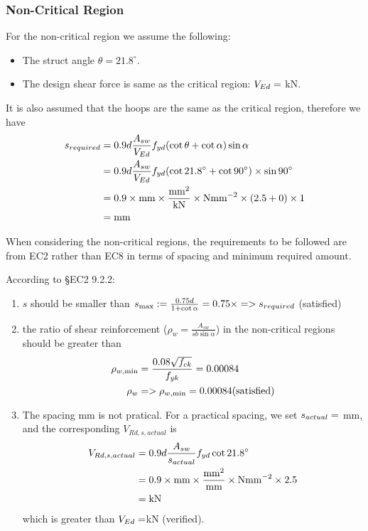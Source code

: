 \subsubsection{Non-Critical Region}
For the non-critical region we assume the following:
\begin{itemize}
\item The struct angle $\theta = 21.8^{\circ}$.
\item The design shear force is same as the critical region: $V_{Ed} =
  \g{VEd}$ kN.
\end{itemize}
It is also assumed that the hoops are the same as the critical region, therefore
we have
\begin{align*}
                 s_{required} &= 0.9d \frac{A_{sw}}{V_{Ed}} f_{yd}
                                (\cot \theta + \cot \alpha)\sin \alpha \\
                              &= 0.9d \frac{A_{sw}}{V_{Ed}} f_{yd} (\cot 21.8^{\circ} +
                                \cot 90 ^{\circ}) \times \sin 90^{\circ}\\
               &= 0.9 \times \g{d} \mbox{mm}
                 \times
                 \frac{\g{Asw}\mbox{mm}^{2}}{\g{VEd} \mbox{kN}}
                 \times \g{fyd} \mbox{Nmm}^{-2}  \times (2.5 + 0) \times 1\\
               &= \g{sreqn} \mbox{mm}
\end{align*}

When considering the non-critical regions, the requirements to be followed are
from EC2 rather than EC8 in terms of spacing and minimum required amount.

According to \S EC2 9.2.2:
\begin{enumerate}
\item $s$ should be smaller than $s_{\max} := \frac{0.75d}{1+\cot\alpha} =
  0.75 \times \g{d} = \g{smaxn} > s_{required}$ (satisfied)
\item the ratio of shear reinforcement ($\rho_w = \frac{A_{sw}}{sb \sin
    \alpha}$) in the non-critical regions should be greater than
\begin{align*}
  \rho_{w,\min} &= \frac{0.08 \sqrt{f_{ck}}}{f_{yk}} = 0.00084 \\
  \rho_w &= \g{rho} > \rho_{w,\min} = 0.00084 \mbox{(satisfied)}
\end{align*}
\item The spacing  mm is not pratical. For a practical spacing, we
  set $s_{actual} = \g{sactn}$ mm, and the corresponding $V_{Rd, s, actual}$
  is
\begin{align*}
  V_{Rd, s, actual} &= 0.9d \frac{A_{sw}}{s_{actual}}f_{yd}\cot  21.8 ^{\circ} \\
                    &= 0.9 \times \g{d} \mbox{mm} \times \frac{\g{Asw}
                      \mbox{mm}^{2}}{\g{sactn} \mbox{mm}}
                      \times \g{fyd} \mbox{Nmm}^{-2} \times 2.5 \\
                    &= \g{VRdsActn} \mbox{kN}
\end{align*}
  which is greater than $V_{Ed} = \g{VEd}$kN (verified).
\end{enumerate}




